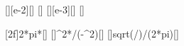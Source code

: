 [\centi\meter][e-2][\meter]
[\newton\per\meter]
[\gram][e-3][\kilo\gram]
[\hertz]

[2\pi f]{2*pi*\fFeX}[\radps]
[]{\mFeX*\omFeX^2*\LFeX/(\kFeX-\mFeX*\omFeX^2)}[\meter]
[]{sqrt(\kFeX/\mFeX)/(2*pi)}[\hertz]
